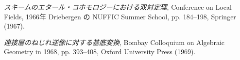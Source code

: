 \begin{description}
\item[{[10]}] \emph{スキームのエタール・コホモロジーにおける双対定理},
Conference on Local Fields, 1966年 Driebergen の NUFFIC Summer School,
pp. 184--198, Springer (1967).

\item[{[11]}] \emph{連接層のねじれ逆像に対する基底変換}, Bombay
Colloquium on Algebraic Geometry in 1968, pp. 393--408, Oxford
University Press (1969).
\end{description}
\normalsize
